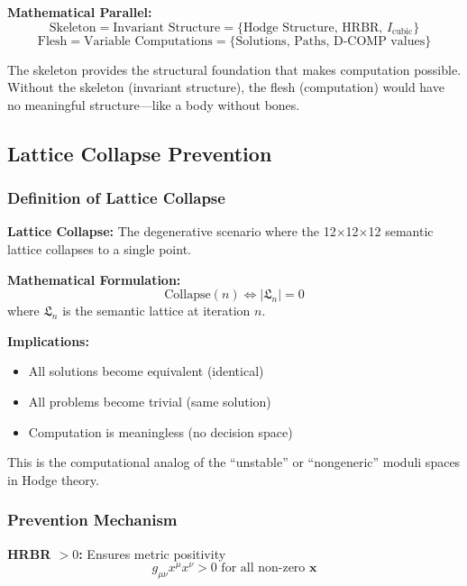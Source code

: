 \documentclass[11pt, letterpaper]{article}
\begin{document}
\textbf{Mathematical Parallel:}
\begin{equation}
\text{Skeleton} = \text{Invariant Structure} = \{ \text{Hodge Structure, HRBR, } I_{\text{cubic}} \}
\end{equation}
\begin{equation}
\text{Flesh} = \text{Variable Computations} = \{ \text{Solutions, Paths, D-COMP values} \}
\end{equation}

The skeleton provides the structural foundation that makes computation possible. Without the skeleton (invariant structure), the flesh (computation) would have no meaningful structure—like a body without bones.

\subsection{Lattice Collapse Prevention}

\subsubsection{Definition of Lattice Collapse}

\textbf{Lattice Collapse:} The degenerative scenario where the 12$\times$12$\times$12 semantic lattice collapses to a single point.

\textbf{Mathematical Formulation:}
\begin{equation}
\text{Collapse}(n) \iff |\mathfrak{L}_n| = 0
\end{equation}
where $\mathfrak{L}_n$ is the semantic lattice at iteration $n$.

\textbf{Implications:}
\begin{itemize}
    \item All solutions become equivalent (identical)
    \item All problems become trivial (same solution)
    \item Computation is meaningless (no decision space)
\end{itemize}

This is the computational analog of the ``unstable'' or ``nongeneric'' moduli spaces in Hodge theory.

\subsubsection{Prevention Mechanism}

\textbf{HRBR $> 0$:} Ensures metric positivity
\begin{equation}
g_{\mu\nu} x^\mu x^\nu > 0 \text{ for all non-zero } \mathbf{x}
\end{equation}
\end{document}
